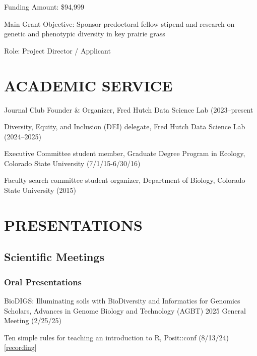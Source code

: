 \documentclass{cv}
\begin{document}
Funding Amount: \$94,999

Main Grant Objective: Sponsor predoctoral fellow stipend and research on genetic and phenotypic diversity in key prairie grass

Role: Project Director / Applicant


\section*{ACADEMIC SERVICE}

Journal Club Founder \& Organizer, Fred Hutch Data Science Lab (2023--present

Diversity, Equity, and Inclusion (DEI) delegate, Fred Hutch Data Science Lab (2024--2025)

Executive Committee student member, Graduate Degree Program in Ecology, Colorado State University (7/1/15-6/30/16)

Faculty search committee student organizer, Department of Biology, Colorado State University (2015)


\section*{PRESENTATIONS}

\subsection*{Scientific Meetings}

\subsubsection*{Oral Presentations}

BioDIGS: Illuminating soils with BioDiversity and Informatics for Genomics Scholars, Advances in Genome Biology and Technology (AGBT) 2025 General Meeting (2/25/25)

Ten simple rules for teaching an introduction to R, Posit::conf (8/13/24) [\href{https://youtu.be/wIt-ypW-a4M?si=VNdVhDTlGUkqGPHb}{recording}]
\end{document}
